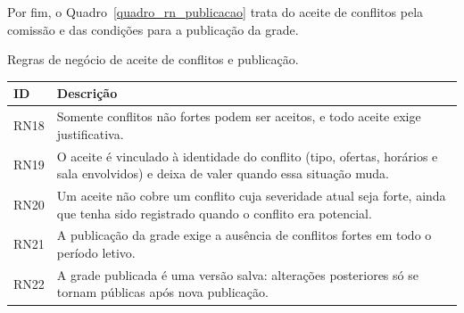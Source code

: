 Por fim, o Quadro~\ref{quadro_rn_publicacao} trata do aceite de conflitos pela comissão e das condições para a publicação da grade.

\begin{quadro}[H]
\centering
\small
\renewcommand{\arraystretch}{1.25}
\caption{Regras de negócio de aceite de conflitos e publicação.}
\label{quadro_rn_publicacao}
\begin{tabularx}{\textwidth}{|I|X|}
\hline
\textbf{ID} & \textbf{Descrição} \\ \hline
RN18 & Somente conflitos não fortes podem ser aceitos, e todo aceite exige justificativa. \\ \hline
RN19 & O aceite é vinculado à identidade do conflito (tipo, ofertas, horários e sala envolvidos) e deixa de valer quando essa situação muda. \\ \hline
RN20 & Um aceite não cobre um conflito cuja severidade atual seja forte, ainda que tenha sido registrado quando o conflito era potencial. \\ \hline
RN21 & A publicação da grade exige a ausência de conflitos fortes em todo o período letivo. \\ \hline
RN22 & A grade publicada é uma versão salva: alterações posteriores só se tornam públicas após nova publicação. \\ \hline
\end{tabularx}
\end{quadro}